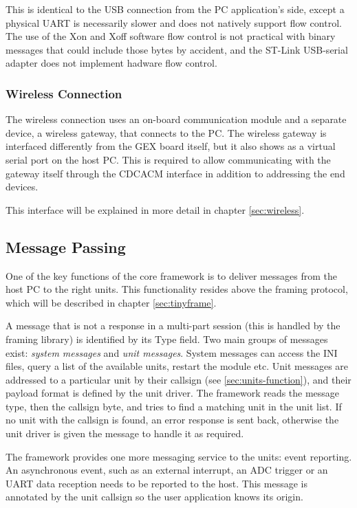This is identical to the \gls{USB} connection from the \gls{PC} application's side, except a physical \gls{UART} is necessarily slower and does not natively support flow control. The use of the Xon and Xoff software flow control is not practical with binary messages that could include those bytes by accident, and the ST-Link \gls{USB}-serial adapter does not implement hadware flow control.

\subsubsection{Wireless Connection}

The wireless connection uses an on-board communication module and a separate device, a wireless gateway, that connects to the \gls{PC}. The wireless gateway is interfaced differently from the GEX board itself, but it also shows as a virtual serial port on the host \gls{PC}. This is required to allow communicating with the gateway itself through the \gls{CDCACM} interface in addition to addressing the end devices.

This interface will be explained in more detail in chapter \ref{sec:wireless}.

\subsection{Message Passing} \label{sec:message_passing}

One of the key functions of the core framework is to deliver messages from the host \gls{PC} to the right units. This functionality resides above the framing protocol, which will be described in chapter \ref{sec:tinyframe}.

A message that is not a response in a multi-part session (this is handled by the framing library) is identified by its Type field. Two main groups of messages exist: \textit{system messages} and \textit{unit messages}. System messages can access the INI files, query a list of the available units, restart the module etc. Unit messages are addressed to a particular unit by their callsign (see \ref{sec:units-function}), and their payload format is defined by the unit driver. The framework reads the message type, then the callsign byte, and tries to find a matching unit in the unit list. If no unit with the callsign is found, an error response is sent back, otherwise the unit driver is given the message to handle it as required.

The framework provides one more messaging service to the units: event reporting. An asynchronous event, such as an external interrupt, an \gls{ADC} trigger or an \gls{UART} data reception needs to be reported to the host. This message is annotated by the unit callsign so the user application knows its origin.


